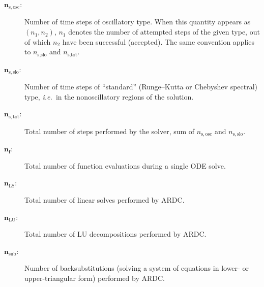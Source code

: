 \documentclass[10pt]{article}
\newcommand{\ie}{{\it i.e.\ }}
\begin{document}
\begin{description}
    \item[$\bm{n_{\mathrm{s,osc}}}$:]{Number of time steps of oscillatory type.
        When this
        quantity appears as $(n_1, n_2)$, $n_1$ denotes the number of attempted
        steps of the given type, out of which $n_2$ have been successful
        (accepted). The same convention applies to $n_{\text{s,slo}}$ and
        $n_{\text{s,tot}}$.}
    \item[$\bm{n_{\mathrm{s,slo}}}$:]{Number of time steps of ``standard''
      (Runge--Kutta or Chebyshev spectral) type, \ie in the nonoscillatory regions of the solution.}
    \item[$\bm{n_{\mathrm{s,tot}}}$:]{Total number of steps performed by the
        solver, sum of $n_{\mathrm{s,osc}}$ and $n_{\mathrm{s,slo}}$.}
    \item[$\bm{n_f}$:]{Total number of function evaluations during a single ODE solve.}
    \item[$\bm{n_{\mathrm{LS}}}$:]{Total number of linear solves
        performed by ARDC.}
    \item[$\bm{n_{\mathrm{LU}}}$:]{Total number of LU decompositions
        performed by ARDC. }
    \item[$\bm{n_{\mathrm{sub}}}$:]{Number of backsubstitutions (solving a
        system of equations in lower- or upper-triangular form) performed by
        ARDC.}
\end{description}
\end{document}
